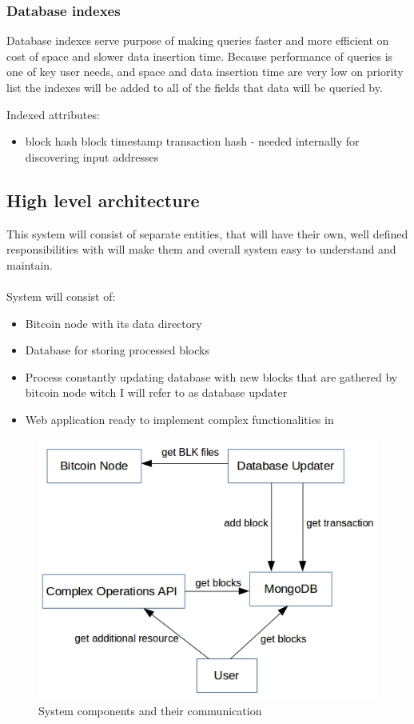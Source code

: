 \documentclass[12pt, en, eng]{mgr}
\begin{document}
 

\subsubsection{Database indexes}

Database indexes serve purpose of making queries faster and more efficient on cost of space and slower data insertion time.
Because performance of queries is one of key user needs, and space and data insertion time are very low on priority list the indexes will be added to all of the fields that data will be queried by.

Indexed attributes:
\begin{itemize}
\item
block hash
block timestamp
transaction hash - needed internally for discovering input addresses
\end{itemize} 


\subsection{High level architecture}
This system will consist of separate entities, that will have their own, well defined responsibilities with will make them and overall system easy to understand and maintain.
\\
\\
System will consist of:
\begin{itemize}
\item
Bitcoin node with its data directory
\item
Database for storing processed blocks
\item
Process constantly updating database with new blocks that are gathered by bitcoin node witch I will refer to as database updater
\item
Web application ready to implement complex functionalities in
\end{itemize}

\begin{figure}[H]
  \includegraphics[width=0.8\linewidth]{component-diagram.png}
  \caption{System components and their communication}
  \label{fig:system-components-and-their-communication}
\end{figure}
\end{document}

